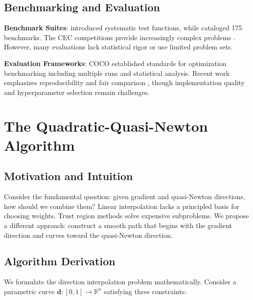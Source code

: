 \hypertarget{benchmarking-and-evaluation}{%
\subsection{Benchmarking and Evaluation}\label{benchmarking-and-evaluation}}

\textbf{Benchmark Suites}: \citet{dejong1975analysis} introduced systematic test functions, while \citet{jamil2013literature} cataloged 175 benchmarks.
The CEC competitions provide increasingly complex problems \citep{liang2013problem}.
However, many evaluations lack statistical rigor or use limited problem sets.

\textbf{Evaluation Frameworks}: COCO \citep{hansen2016coco} established standards for optimization benchmarking including multiple runs and statistical analysis.
Recent work emphasizes reproducibility \citep{beiranvand2017best} and fair comparison \citep{schmidt2021descending}, though implementation quality and hyperparameter selection remain challenges.

\hypertarget{the-quadratic-quasi-newton-algorithm}{%
\section{The Quadratic-Quasi-Newton Algorithm}\label{the-quadratic-quasi-newton-algorithm}}

\hypertarget{motivation-and-intuition}{%
\subsection{Motivation and Intuition}\label{motivation-and-intuition}}

Consider the fundamental question: given gradient and quasi-Newton directions, how should we combine them?
Linear interpolation lacks a principled basis for choosing weights.
Trust region methods solve expensive subproblems.
We propose a different approach: construct a smooth path that begins with the gradient direction and curves toward the quasi-Newton direction.

\hypertarget{algorithm-derivation}{%
\subsection{Algorithm Derivation}\label{algorithm-derivation}}

We formulate the direction interpolation problem mathematically. Consider a parametric curve
\(\mathbf{d}: [0,1] \rightarrow \mathbb{R}^n\) satisfying three constraints:

